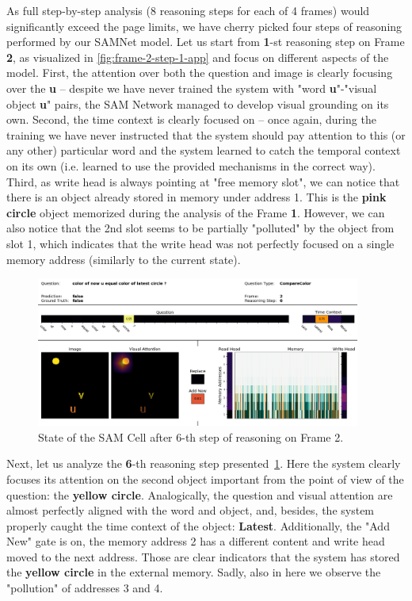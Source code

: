 As full step-by-step analysis (8 reasoning steps for each of 4 frames) would significantly exceed the page limits, we have cherry picked four steps of reasoning performed by our SAMNet model.
Let us start from \textbf{1}-st reasoning step on Frame \textbf{2}, as visualized in \cref{fig:frame-2-step-1-app} and focus on different aspects of the model.
First, the attention over both the question and image is clearly focusing over the \textbf{u} -- despite we have never trained the system with "word \textbf{u}"-"visual object \textbf{u}" pairs, the SAM Network managed to develop visual grounding on its own.
Second, the time context is clearly focused on  -- once again, during the training we have never instructed that the system should pay attention to this (or any other) particular word and the system learned to catch the temporal context on its own (i.e. learned to use the provided mechanisms in the correct way).
Third, as write head is always pointing at "free memory slot", we can notice that there is an object already stored in memory under address 1.
This is the \textbf{pink circle} object memorized during the analysis of the Frame \textbf{1}.
However, we can also notice that the 2nd slot seems to be partially "polluted" by the object from slot 1, which indicates that the write head was not perfectly focused on a single memory address (similarly to the current state).


\begin{figure}[!h]
\centering
  \includegraphics[width=0.95\textwidth]{"../img/visualization/experiment_run_20190917_022319/Frame 2 Step 6"}
\caption{State of the SAM Cell after 6-th step of reasoning on Frame 2.} 
\label{fig:frame-2-step-6-app}
\end{figure}

Next, let us analyze the \textbf{6}-th reasoning step presented~\cref{fig:frame-2-step-6-app}.
Here the system clearly focuses its attention on the second object important from the point of view of the question: the \textbf{yellow circle}.
Analogically, the question and visual attention are almost perfectly aligned with the word and object, and, besides, the system  properly caught the time context of the object: \textbf{Latest}.
Additionally, the "Add New" gate is on, the memory address 2 has a different content and write head moved to the next address.
Those are clear indicators that the system has stored the \textbf{yellow circle} in the external memory.
Sadly, also  in here we observe the "pollution" of addresses 3 and 4.

